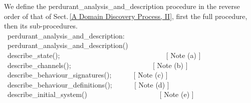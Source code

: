 \begynd
\pind We define the  \textsf{perdurant\_analysis\_and\_description}
      procedure
\begynd
\pind in the reverse order of that of Sect.\,\vref{A Domain Discovery Process, II},
\pind first the full procedure,
\pind then its sub-procedures.
\afslut
\afslut{}
\HHHH
\label{DiscoverySchema4}
\bp
{}\\
\>\ perdurant\_analysis\_and\_description:  {\RIGHTARROW} \\
\>\ perdurant\_analysis\_and\_description() {\IS} \label{PAaD}\\
\>\>\>\ describe\_state(); \ \ \ \ \ \ \ \ \ \ \ \ \ \ \ \ \ \ \ \ \ \ \ \ \ \  {\DOTDOTDOT} \ \ \ [ Note (a) ]\\
\>\>\>\ describe\_channels(); \ \ \ \ \ \ \ \ \ \ \ \ \ \ \ \ \ \ \  {\DOTDOTDOT} \ \ \ [ Note (b) ]\\
\>\>\>\ describe\_behaviour\_signatures(); \ \ {\DOTDOTDOT} \ \ \ [ Note (c) ]\\
\>\>\>\ describe\_behaviour\_definitions(); \ \ {\DOTDOTDOT} \ \ \ [ Note (d) ]\\
\>\>\>\ describe\_initial\_system()\ \ \ \ \ \ \ \ \ \ \ \ \ \ \  \ \ {\DOTDOTDOT} \ \ \ [ Note (e) ]
\ep
\endboiteepaisseavecuntitre\pos{\normalsize}{\HHHH}\rm
\noindent
\pos{\psno}{\mnewfoil}\LLLL
